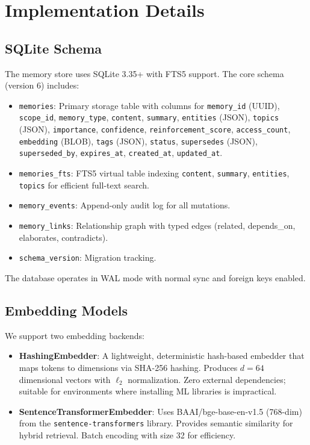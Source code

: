 \section{Implementation Details}
\label{app:implementation}

\subsection{SQLite Schema}
\label{app:schema}

The memory store uses SQLite 3.35+ with FTS5 support. The core schema (version 6) includes:

\begin{itemize}[leftmargin=*,itemsep=1pt]
    \item \texttt{memories}: Primary storage table with columns for \texttt{memory\_id} (UUID), \texttt{scope\_id}, \texttt{memory\_type}, \texttt{content}, \texttt{summary}, \texttt{entities} (JSON), \texttt{topics} (JSON), \texttt{importance}, \texttt{confidence}, \texttt{reinforcement\_score}, \texttt{access\_count}, \texttt{embedding} (BLOB), \texttt{tags} (JSON), \texttt{status}, \texttt{supersedes} (JSON), \texttt{superseded\_by}, \texttt{expires\_at}, \texttt{created\_at}, \texttt{updated\_at}.
    \item \texttt{memories\_fts}: FTS5 virtual table indexing \texttt{content}, \texttt{summary}, \texttt{entities}, \texttt{topics} for efficient full-text search.
    \item \texttt{memory\_events}: Append-only audit log for all mutations.
    \item \texttt{memory\_links}: Relationship graph with typed edges (related, depends\_on, elaborates, contradicts).
    \item \texttt{schema\_version}: Migration tracking.
\end{itemize}

The database operates in WAL mode with normal sync and foreign keys enabled.

\subsection{Embedding Models}
\label{app:embeddings}

We support two embedding backends:

\begin{itemize}[leftmargin=*,itemsep=1pt]
    \item \textbf{HashingEmbedder}: A lightweight, deterministic hash-based embedder that maps tokens to dimensions via SHA-256 hashing. Produces $d{=}64$ dimensional vectors with $\ell_2$ normalization. Zero external dependencies; suitable for environments where installing ML libraries is impractical.
    \item \textbf{SentenceTransformerEmbedder}: Uses BAAI/bge-base-en-v1.5 (768-dim) from the \texttt{sentence-transformers} library. Provides semantic similarity for hybrid retrieval. Batch encoding with size 32 for efficiency.
\end{itemize}

